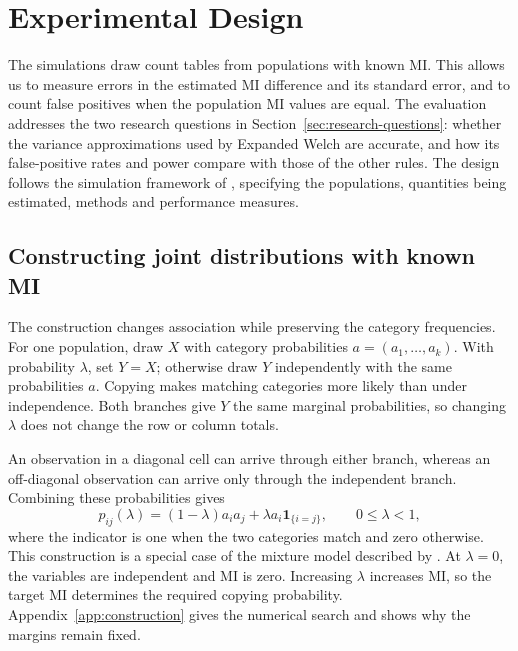\chapter{Experimental Design}
\label{chap:design}

The simulations draw count tables from populations with known MI. This
allows us to measure errors in the estimated MI difference and its
standard error, and to count false positives when the population MI
values are equal. The evaluation addresses the two research questions in
Section~\ref{sec:research-questions}: whether the variance approximations
used by Expanded Welch are accurate, and how its false-positive rates
and power compare with those of the other rules. The design follows the simulation
framework of \citet{morris2019}, specifying the populations, quantities
being estimated, methods and performance measures.

\section{Constructing joint distributions with known MI}

The construction changes association while preserving the category
frequencies. For one population, draw \(X\) with category probabilities
\(a=(a_1,\ldots,a_k)\). With probability \(\lambda\), set \(Y=X\);
otherwise draw \(Y\) independently with the same probabilities \(a\).
Copying makes matching categories more likely than under independence.
Both branches give \(Y\) the same marginal probabilities, so changing
\(\lambda\) does not change the row or column totals.

An observation in a diagonal cell can arrive through either branch,
whereas an off-diagonal observation can arrive only through the
independent branch.
Combining these probabilities gives
\begin{equation}
 p_{ij}(\lambda)=(1-\lambda)a_i a_j
                  +\lambda a_i\mathbf{1}_{\{i=j\}},
 \qquad 0\leq\lambda<1,
 \label{eq:copying-construction}
\end{equation}
where the indicator is one when the two categories match and zero otherwise.
This construction is a special case of the mixture model described by
\citet{bocci2010}.
At \(\lambda=0\), the variables are independent and MI is zero.
Increasing \(\lambda\) increases MI, so the target MI determines the required
copying probability. Appendix~\ref{app:construction} gives the numerical
search and shows why the margins remain fixed.

